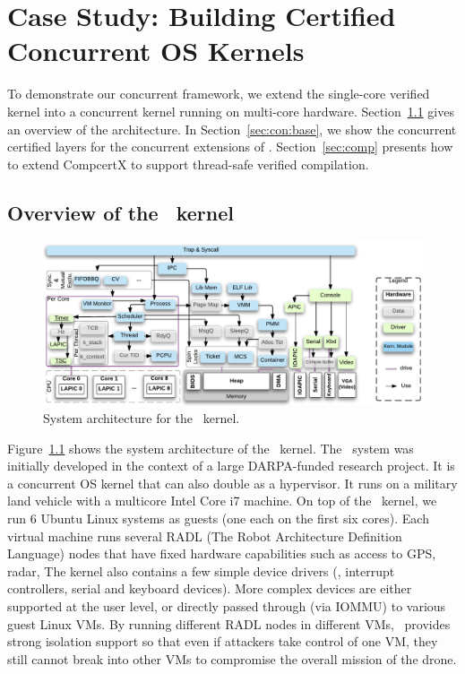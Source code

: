 \chapter{Case Study: Building Certified Concurrent OS Kernels}
\label{chap:conkernel}

To demonstrate our concurrent framework,
we extend the \mCTOS{} single-core verified kernel into a
concurrent kernel \cCTOS{} running on multi-core hardware.
Section~\ref{sec:con:overview}
gives an overview of the \cCTOS{} architecture.
In Section~\ref{sec:con:base},
we show the concurrent certified layers
for the concurrent extensions of \cCTOS{}.
Section~\ref{sec:comp} presents how
to extend CompcertX to support
thread-safe verified compilation.

\section{Overview of the \cCTOS\ kernel}
\label{sec:con:overview}

\begin{figure}[t]\centering
\includegraphics[scale=.78]{figs/sysarch}
\caption{System architecture for the \cCTOS\ kernel.}
\label{fig:sysarch}
\hrulefill
\end{figure}

Figure~\ref{fig:sysarch} shows the system architecture of the
\cCTOS\ kernel. The \cCTOS\ system was initially developed in the
context of a large DARPA-funded research project.  
It is a concurrent
OS kernel that can also double as a hypervisor.  It runs on a military
land vehicle with a multicore Intel Core i7 machine. On top of the
\cCTOS\ kernel, we run 6 Ubuntu Linux systems as guests (one each on
the first six cores). Each virtual machine runs several RADL (The
Robot Architecture Definition Language) nodes that have fixed hardware
capabilities such as access to GPS, radar, \etc{}  The kernel also
contains a few simple device drivers (\eg, interrupt controllers,
serial and keyboard devices). More complex devices are either
supported at the user level, or directly passed through (via
IOMMU) to various guest Linux VMs. By running different RADL nodes in
different VMs, \cCTOS\ provides strong isolation support so that even
if attackers take control of one VM, they still cannot break into
other VMs to compromise the overall mission of the drone.

